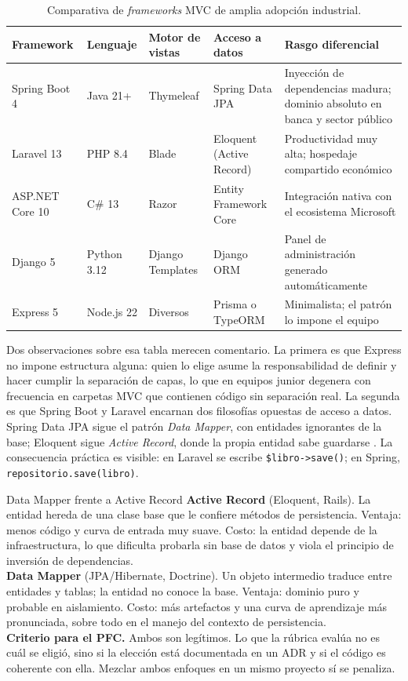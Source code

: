 \documentclass[11pt,a4paper,openany]{book}
\begin{document}
\begin{table}[htbp]
	\centering
	\caption{Comparativa de \emph{frameworks} MVC de amplia adopción industrial.}
	\label{tab:u4:comparativa}
	\scriptsize
	\begin{tabularx}{\textwidth}{L{2.1cm} L{1.9cm} L{2.4cm} L{2.4cm} X}
		\toprule
		\textbf{Framework} & \textbf{Lenguaje} & \textbf{Motor de vistas} & \textbf{Acceso a datos} & \textbf{Rasgo diferencial} \\
		\midrule
		Spring Boot 4 & Java 21+ & Thymeleaf & Spring Data JPA & Inyección de dependencias madura; dominio absoluto en banca y sector público \\
		Laravel 13 & PHP 8.4 & Blade & Eloquent (Active Record) & Productividad muy alta; hospedaje compartido económico \\
		ASP.NET Core 10 & C\# 13 & Razor & Entity Framework Core & Integración nativa con el ecosistema Microsoft \\
		Django 5 & Python 3.12 & Django Templates & Django ORM & Panel de administración generado automáticamente \\
		Express 5 & Node.js 22 & Diversos & Prisma o TypeORM & Minimalista; el patrón lo impone el equipo \\
		\bottomrule
	\end{tabularx}
\end{table}

Dos observaciones sobre esa tabla merecen comentario. La primera es que Express no impone estructura alguna: quien lo elige asume la responsabilidad de definir y hacer cumplir la separación de capas, lo que en equipos junior degenera con frecuencia en carpetas MVC que contienen código sin separación real. La segunda es que Spring Boot y Laravel encarnan dos filosofías opuestas de acceso a datos. Spring Data JPA sigue el patrón \emph{Data Mapper}, con entidades ignorantes de la base; Eloquent sigue \emph{Active Record}, donde la propia entidad sabe guardarse \cite{fowler2002patterns}. La consecuencia práctica es visible: en Laravel se escribe \texttt{\$libro->save()}; en Spring, \texttt{repositorio.save(libro)}.

\begin{cajacompara}{Data Mapper frente a Active Record}
	\textbf{Active Record} (Eloquent, Rails). La entidad hereda de una clase base que le confiere métodos de persistencia. Ventaja: menos código y curva de entrada muy suave. Costo: la entidad depende de la infraestructura, lo que dificulta probarla sin base de datos y viola el principio de inversión de dependencias.\\[3pt]
	\textbf{Data Mapper} (JPA/Hibernate, Doctrine). Un objeto intermedio traduce entre entidades y tablas; la entidad no conoce la base. Ventaja: dominio puro y probable en aislamiento. Costo: más artefactos y una curva de aprendizaje más pronunciada, sobre todo en el manejo del contexto de persistencia.\\[3pt]
	\textbf{Criterio para el PFC.} Ambos son legítimos. Lo que la rúbrica evalúa no es cuál se eligió, sino si la elección está documentada en un ADR y si el código es coherente con ella. Mezclar ambos enfoques en un mismo proyecto sí se penaliza.
\end{cajacompara}
\end{document}
